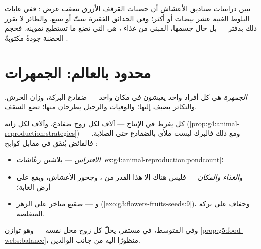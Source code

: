 \begin{example}\label{ex:g8:reproduction-and-environment:clutch}
تبين دراسات صناديق الأعشاش أن حضنات القرقف الأزرق تتعقب عرض
: ففي غابات البلوط الغنية عشر بيضات أو أكثر؛ وفي الحدائق
الفقيرة ستّ أو سبع. والطائر لا يقرر ذلك بدفتر --- بل حال جسمها،
المبني من غذاء ، هي التي تضع ما تستطيع تموينه. فحجم الحضنة
جودةُ  مكتوبةً .
\end{example}

\section{محدود بالعالم: الجمهرات}

\begin{definition}[الجمهرة]\label{def:g8:reproduction-and-environment:population}
\emph{الجمهرة} هي كل أفراد  واحد يعيشون في مكان
واحد --- ضفادع البركة، وزان الحرش. والتكاثر يضيف إليها؛ والوفيات
والرحيل يطرحان منها؛  تضع السقف.
\end{definition}

\begin{proposition}\label{prop:g8:reproduction-and-environment:limits}
كل  يفرط في الإنتاج --- آلاف  لكل زوج ضفادع، وآلاف 
لكل زانة (\cref{prop:g4:animal-reproduction:strategies}) --- ومع
ذلك فالبرك ليست ملأى بالضفادع حتى الصلابة. فالفائض يُنفَق في مقابل
كوابح :
\begin{itemize}
  \item \emph{الافتراس} --- بلاشين  رعّاشات
        \cref{ex:g4:animal-reproduction:pondcount}؛
  \item و\emph{الغذاء والمكان} --- فليس هناك إلا هذا القدر من
        ، وجحور الأعشاش، وبقع  على أرض الغابة؛
  \item و\emph{} --- صقيع متأخر على الزهر
        (\cref{exo:g3:flowers-fruits-seeds:9})، وجفاف على بركة
         المتقلصة.
\end{itemize}
وفي المتوسط، في  مستقر، يحلّ كل زوج محل نفسه --- وهو توازن
\cref{prop:g5:food-webs:balance}، منظورًا إليه من جانب
الوالدين.
\end{proposition}
\admitted

